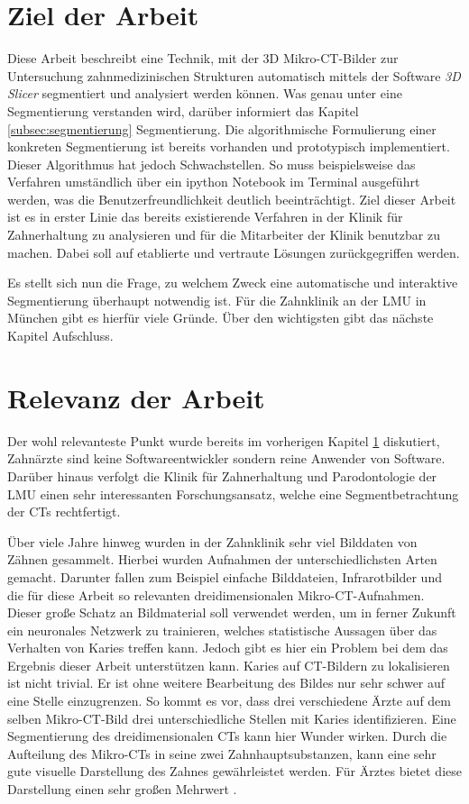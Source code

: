 \section{Ziel der Arbeit}
\label{sec:ziel_der_arbeit} Diese Arbeit beschreibt eine Technik, mit der \ac{3D}
Mikro-CT-Bilder zur Untersuchung zahnmedizinischen Strukturen automatisch
mittels der Software \textit{3D Slicer} segmentiert und analysiert werden können.
Was genau unter eine Segmentierung verstanden wird, darüber informiert das Kapitel
\ref{subsec:segmentierung} Segmentierung. Die algorithmische Formulierung einer
konkreten Segmentierung ist bereits vorhanden und prototypisch implementiert. Dieser
Algorithmus hat jedoch Schwachstellen. So muss beispielsweise das Verfahren
umständlich über ein ipython Notebook im Terminal ausgeführt werden, was die Benutzerfreundlichkeit
deutlich beeinträchtigt. Ziel dieser Arbeit ist es in erster Linie das bereits
existierende Verfahren in der Klinik für Zahnerhaltung zu analysieren und für
die Mitarbeiter der Klinik benutzbar zu machen. Dabei soll auf etablierte und vertraute
Lösungen zurückgegriffen werden.

Es stellt sich nun die Frage, zu welchem Zweck eine automatische und interaktive
Segmentierung überhaupt notwendig ist. Für die Zahnklinik an der LMU in München gibt
es hierfür viele Gründe. Über den wichtigsten gibt das nächste Kapitel
Aufschluss.

\section{Relevanz der Arbeit}
\label{sec:relevanz_der_arbeit} Der wohl relevanteste Punkt wurde bereits im
vorherigen Kapitel \ref{sec:ziel_der_arbeit} diskutiert, Zahnärzte sind keine Softwareentwickler
sondern reine Anwender von Software. Darüber hinaus verfolgt die Klinik für
Zahnerhaltung und Parodontologie der \ac{LMU} einen sehr interessanten Forschungsansatz,
welche eine Segmentbetrachtung der CTs rechtfertigt.

Über viele Jahre hinweg wurden in der Zahnklinik sehr viel Bilddaten von Zähnen
gesammelt. Hierbei wurden Aufnahmen der unterschiedlichsten Arten gemacht.
Darunter fallen zum Beispiel einfache Bilddateien, Infrarotbilder und die für diese
Arbeit so relevanten dreidimensionalen Mikro-CT-Aufnahmen. Dieser große Schatz
an Bildmaterial soll verwendet werden, um in ferner Zukunft ein neuronales Netzwerk
zu trainieren, welches statistische Aussagen über das Verhalten von Karies
treffen kann. Jedoch gibt es hier ein Problem bei dem das Ergebnis dieser Arbeit
unterstützen kann. Karies auf CT-Bildern zu lokalisieren ist nicht trivial. Er ist
ohne weitere Bearbeitung des Bildes nur sehr schwer auf eine Stelle einzugrenzen.
So kommt es vor, dass drei verschiedene Ärzte auf dem selben Mikro-CT-Bild drei unterschiedliche
Stellen mit Karies identifizieren. Eine Segmentierung des dreidimensionalen CTs
kann hier Wunder wirken. Durch die Aufteilung des Mikro-CTs in seine zwei Zahnhauptsubstanzen,
kann eine sehr gute visuelle Darstellung des Zahnes gewährleistet werden. Für Ärztes
bietet diese Darstellung einen sehr großen Mehrwert \citep[vgl.][S. 1]{walter2025projekt}.

